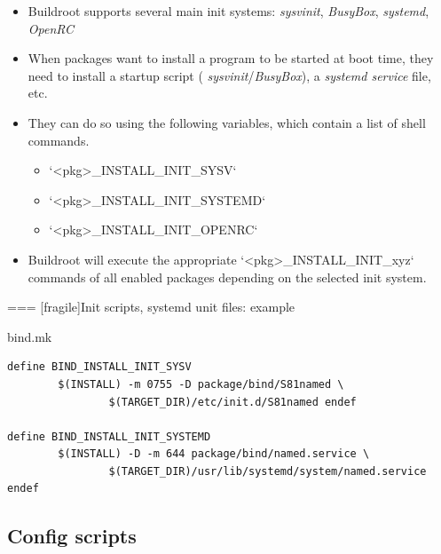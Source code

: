 \begin{itemize}

\item Buildroot supports several main init systems: {\em sysvinit},
  {\em BusyBox}, {\em systemd}, {\em OpenRC}

\item When packages want to install a program to be started at boot
  time, they need to install a startup script ({\em
    sysvinit}/{\em BusyBox}), a {\em systemd service} file, etc.

\item They can do so using the following variables, which contain a
  list of shell commands.
  \begin{itemize}
  \item `<pkg>_INSTALL_INIT_SYSV`
  \item `<pkg>_INSTALL_INIT_SYSTEMD`
  \item `<pkg>_INSTALL_INIT_OPENRC`
  \end{itemize}

\item Buildroot will execute the appropriate
  `<pkg>_INSTALL_INIT_xyz` commands of all enabled packages
  depending on the selected init system.

\end{itemize}



=== [fragile]{Init scripts, systemd unit files: example}

\begin{block}{bind.mk}
  \begin{verbatim}
define BIND_INSTALL_INIT_SYSV
        $(INSTALL) -m 0755 -D package/bind/S81named \
                $(TARGET_DIR)/etc/init.d/S81named endef

define BIND_INSTALL_INIT_SYSTEMD
        $(INSTALL) -D -m 644 package/bind/named.service \
                $(TARGET_DIR)/usr/lib/systemd/system/named.service endef
  \end{verbatim}
\end{block}



\subsection{Config scripts}

